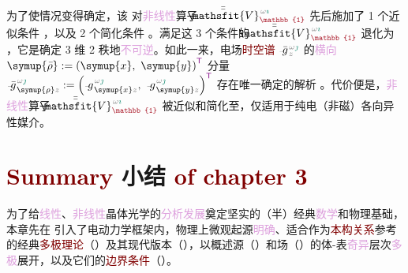 为了使情况变得确定，该  对\textcolor{Plum}{非线性}算子 $\Xint{\mathcolor{gray}{-}}{25}{\bar{\bar{\mathsfit{V}}}}^{\;\! \mathcolor{gray}{\omega} \textcolor{PineGreen}{\imath}}_{\textcolor{Maroon}{\mathbb{1}}}$ 先后施加了 1 个近似条件 ，以及 2 个简化条件 。满足这 3 个条件的 $\Xint{\mathcolor{gray}{-}}{25}{\bar{\bar{\mathsfit{V}}}}^{\;\! \mathcolor{gray}{\omega} \textcolor{PineGreen}{\imath}}_{\textcolor{Maroon}{\mathbb{1}}}$ 退化为 ，它是确定 3 维 2 秩地\textcolor{Plum}{不可逆}。如此一来，电场\textcolor{Maroon}{时空谱} $\Xint{{}^{}_{\mathcolor{gray}{-}}}{10}{\bar{g}}^{\;\!\mathcolor{gray}{\omega} \textcolor{PineGreen}{\jmath}}_{\;\! \mathcolor{gray}{z}}$ 的\textcolor{Plum}{横向} $\symup{\bar{\rho}} := \left( \symup{x},~ \symup{y} \right)^{\mathsf{\textcolor{Plum}{T}}}$ 分量 $\Xint{{}^{}_{\mathcolor{gray}{-}}}{10}{\bar{g}}^{\;\!\mathcolor{gray}{\omega} \textcolor{PineGreen}{\jmath}}_{\;\! \symup{\rho} \mathcolor{gray}{z}} := \left( \Xint{{}^{}_{\mathcolor{gray}{-}}}{10}{g}^{\;\!\mathcolor{gray}{\omega} \textcolor{PineGreen}{\jmath}}_{\;\! \symup{x} \mathcolor{gray}{z}},~ \Xint{{}^{}_{\mathcolor{gray}{-}}}{10}{g}^{\;\!\mathcolor{gray}{\omega} \textcolor{PineGreen}{\jmath}}_{\;\! \symup{y} \mathcolor{gray}{z}} \right)^{\mathsf{\textcolor{Plum}{T}}}$ 存在唯一确定的解析 。代价便是，\textcolor{Plum}{非线性}算子 $\Xint{\mathcolor{gray}{-}}{25}{\bar{\bar{\mathsfit{V}}}}^{\;\! \mathcolor{gray}{\omega} \textcolor{PineGreen}{\imath}}_{\textcolor{Maroon}{\mathbb{1}}}$ 被近似和简化至，仅适用于\textcolor{PineGreen}{纯电（非磁）各向异性}媒介。

\clearpage

\section{\textcolor{Maroon}{Summary} 小结 \textcolor{Maroon}{of chapter 3}}\label{sec:summary-chapter3}

为了给\textcolor{Plum}{线性}、\textcolor{Plum}{非线性}\textcolor{PineGreen}{晶体光学}的\textcolor{Plum}{分析发展}奠定坚实的（\textcolor{NavyBlue}{半}）\textcolor{NavyBlue}{经典}\textcolor{Plum}{数学}和\textcolor{NavyBlue}{物理}基础，本章先在  引入了\textcolor{NavyBlue}{电动力学}框架内，\textcolor{NavyBlue}{物理上微观起源}\textcolor{Plum}{明确}、适合作为\textcolor{Maroon}{本构关系}参考的经典\textcolor{Maroon}{多极理论}（）及其现代版本（），以概述\textcolor{NavyBlue}{源}（）和\textcolor{NavyBlue}{场}（）的体-表\textcolor{Plum}{奇异}层次\textcolor{Plum}{多极}展开，以及它们的\textcolor{Maroon}{边界条件}（）。

